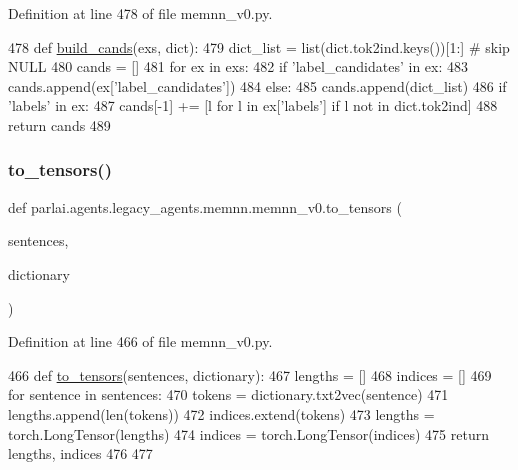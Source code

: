 Definition at line 478 of file memnn\+\_\+v0.\+py.


\begin{DoxyCode}
478 \textcolor{keyword}{def }\hyperlink{namespaceparlai_1_1agents_1_1legacy__agents_1_1memnn_1_1memnn__v0_ab07fdb540c02e8e2a1cc7e8cf662a8b8}{build\_cands}(exs, dict):
479     dict\_list = list(dict.tok2ind.keys())[1:]  \textcolor{comment}{# skip NULL}
480     cands = []
481     \textcolor{keywordflow}{for} ex \textcolor{keywordflow}{in} exs:
482         \textcolor{keywordflow}{if} \textcolor{stringliteral}{'label\_candidates'} \textcolor{keywordflow}{in} ex:
483             cands.append(ex[\textcolor{stringliteral}{'label\_candidates'}])
484         \textcolor{keywordflow}{else}:
485             cands.append(dict\_list)
486             \textcolor{keywordflow}{if} \textcolor{stringliteral}{'labels'} \textcolor{keywordflow}{in} ex:
487                 cands[-1] += [l \textcolor{keywordflow}{for} l \textcolor{keywordflow}{in} ex[\textcolor{stringliteral}{'labels'}] \textcolor{keywordflow}{if} l \textcolor{keywordflow}{not} \textcolor{keywordflow}{in} dict.tok2ind]
488     \textcolor{keywordflow}{return} cands
489 \end{DoxyCode}
\mbox{\label{namespaceparlai_1_1agents_1_1legacy__agents_1_1memnn_1_1memnn__v0_a8bf19c6993b40602c1d86a848b30c5a1}} 
\subsubsection{\texorpdfstring{to\+\_\+tensors()}{to\_tensors()}}
{\footnotesize\ttfamily def parlai.\+agents.\+legacy\+\_\+agents.\+memnn.\+memnn\+\_\+v0.\+to\+\_\+tensors (\begin{DoxyParamCaption}\item[{}]{sentences,  }\item[{}]{dictionary }\end{DoxyParamCaption})}



Definition at line 466 of file memnn\+\_\+v0.\+py.


\begin{DoxyCode}
466 \textcolor{keyword}{def }\hyperlink{namespaceparlai_1_1agents_1_1legacy__agents_1_1memnn_1_1memnn__v0_a8bf19c6993b40602c1d86a848b30c5a1}{to\_tensors}(sentences, dictionary):
467     lengths = []
468     indices = []
469     \textcolor{keywordflow}{for} sentence \textcolor{keywordflow}{in} sentences:
470         tokens = dictionary.txt2vec(sentence)
471         lengths.append(len(tokens))
472         indices.extend(tokens)
473     lengths = torch.LongTensor(lengths)
474     indices = torch.LongTensor(indices)
475     \textcolor{keywordflow}{return} lengths, indices
476 
477 
\end{DoxyCode}
